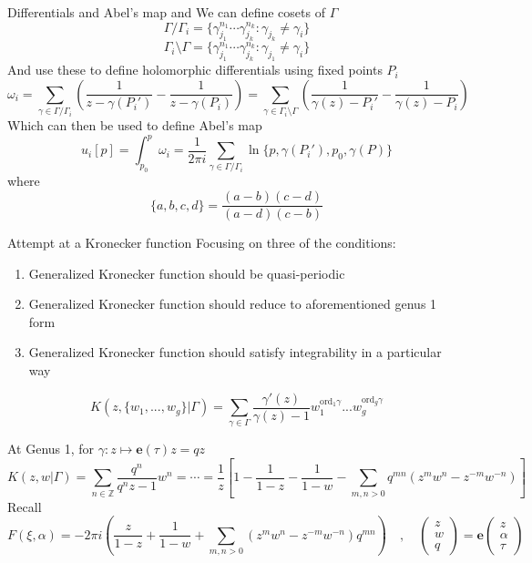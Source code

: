 \documentclass[11pt,aspectratio=169]{beamer}
\newcommand{\ee}[0]{\mathbf{e}}
\begin{document}
\begin{frame}{Differentials and Abel's map}{\tiny \cite{ComputationalSchottky} and \cite{Cha22}}
    We can define cosets of $\Gamma$
    \[\Gamma / \Gamma_i = \{\gamma_{j_1}^{n_1}\cdots \gamma_{j_k}^{n_k}: \gamma_{j_k} \neq \gamma_i\}\]
    \[\Gamma_i \setminus \Gamma  = \{\gamma_{j_1}^{n_1}\cdots \gamma_{j_k}^{n_k}: \gamma_{j_1} \neq \gamma_i\}\]
    And use these to define holomorphic differentials using fixed points $P_i$
    \[\omega_i = \sum_{\gamma \in \Gamma / \Gamma_i} \left(\frac{1}{z-\gamma(P_i')} - \frac{1}{z-\gamma(P_i)}\right) = \sum_{\gamma \in \Gamma_i \setminus \Gamma } \left(\frac{1}{\gamma(z)-P_i'} - \frac{1}{\gamma(z)-P_i}\right)\]
    Which can then be used to define Abel's map
    \[u_i[p] = \int_{p_0}^p \omega_i = \frac{1}{2\pi i} \sum_{\gamma \in \Gamma/\Gamma_i} \ln \{p,\gamma(P_i'),p_0,\gamma(P)\}\]
    where
    \[\{a,b,c,d\} = \frac{(a-b)(c-d)}{(a-d)(c-b)}\]
\end{frame}

\begin{frame}{Attempt at a Kronecker function}{\tiny \cite{Cha22}}
    Focusing on three of the conditions:
    \begin{enumerate}
        \item Generalized Kronecker function should be quasi-periodic
        \item Generalized Kronecker function should reduce to aforementioned genus 1 form
        \item Generalized Kronecker function should satisfy integrability in a particular way
    \end{enumerate}
    \[K(z,\{w_1,...,w_g\}|\Gamma) = \sum_{\gamma \in \Gamma} \frac{\gamma'(z)}{\gamma(z)-1} w_1^{\mathrm{ord}_1\gamma}...w_g^{\mathrm{ord}_g\gamma}\]
    
    At Genus 1, for $\gamma : z \mapsto \ee(\tau) z = qz$
    \[K(z,w|\Gamma) = \sum_{n \in \mathbb Z} \frac{q^n}{q^n z - 1} w^n = \cdots = \frac{1}{z} \left[1 - \frac{1}{1-z} - \frac{1}{1-w} - \sum_{m,n > 0} q^{mn} (z^m w^n - z^{-m} w^{-n})\right]\]
    Recall
    \[F(\xi,\alpha) = -2\pi i \left(\frac{z}{1-z} + \frac{1}{1-w} + \sum_{m,n > 0} (z^m w^n - z^{-m} w^{-n}) q^{mn}\right) \quad , \quad \begin{pmatrix} z \\ w \\ q \end{pmatrix} = \ee \begin{pmatrix}z \\ \alpha \\ \tau\end{pmatrix}\]
\end{frame}
\end{document}
